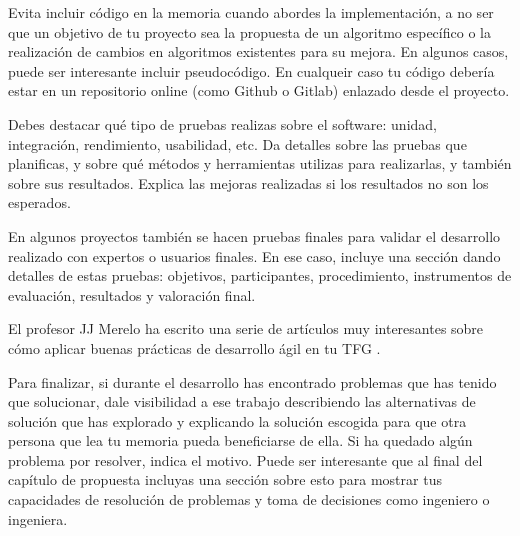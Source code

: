 Evita incluir código en la memoria cuando abordes la implementación, a no ser que un objetivo de tu proyecto sea la propuesta de un algoritmo específico o la realización de cambios en algoritmos existentes para su mejora. En algunos casos, puede ser interesante incluir pseudocódigo. En cualqueir caso tu código debería estar en un repositorio online (como Github o Gitlab) enlazado desde el proyecto.

Debes destacar qué tipo de pruebas realizas sobre el software: unidad, integración, rendimiento, usabilidad, etc. Da detalles sobre las pruebas que planificas, y sobre qué métodos y herramientas utilizas para realizarlas, y también sobre sus resultados. Explica las mejoras realizadas si los resultados no son los esperados. 

En algunos proyectos también se hacen pruebas finales para validar el desarrollo realizado con expertos o usuarios finales. En ese caso, incluye una sección dando detalles de estas pruebas: objetivos, participantes, procedimiento, instrumentos de evaluación, resultados y valoración final.

El profesor JJ Merelo ha escrito una serie de artículos muy interesantes sobre cómo aplicar buenas prácticas de desarrollo ágil en tu TFG \cite{TFGs2024JJ}.


Para finalizar, si durante el desarrollo has encontrado problemas que has tenido que solucionar, dale visibilidad a ese trabajo describiendo las alternativas de solución que has explorado y explicando la solución escogida para que otra persona que lea tu memoria pueda beneficiarse de ella. Si ha quedado algún problema por resolver, indica el motivo. Puede ser interesante que al final del capítulo de propuesta incluyas una sección sobre esto para mostrar tus capacidades de resolución de problemas y toma de decisiones como ingeniero o ingeniera. 


